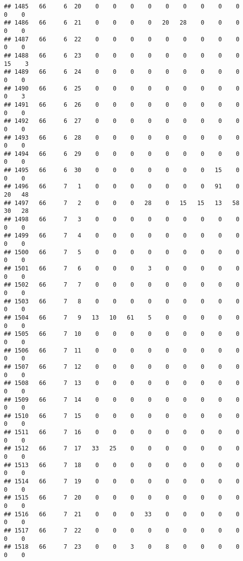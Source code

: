 \documentclass[]{article}
\begin{document}
\begin{verbatim}
## 1485   66     6  20    0    0    0    0    0    0    0    0    0    0    0
## 1486   66     6  21    0    0    0    0   20   28    0    0    0    0    0
## 1487   66     6  22    0    0    0    0    0    0    0    0    0    0    0
## 1488   66     6  23    0    0    0    0    0    0    0    0    0   15    3
## 1489   66     6  24    0    0    0    0    0    0    0    0    0    0    0
## 1490   66     6  25    0    0    0    0    0    0    0    0    0    0    3
## 1491   66     6  26    0    0    0    0    0    0    0    0    0    0    0
## 1492   66     6  27    0    0    0    0    0    0    0    0    0    0    0
## 1493   66     6  28    0    0    0    0    0    0    0    0    0    0    0
## 1494   66     6  29    0    0    0    0    0    0    0    0    0    0    0
## 1495   66     6  30    0    0    0    0    0    0    0   15    0    0    0
## 1496   66     7   1    0    0    0    0    0    0    0   91    0   20   48
## 1497   66     7   2    0    0    0   28    0   15   15   13   58   30   28
## 1498   66     7   3    0    0    0    0    0    0    0    0    0    0    0
## 1499   66     7   4    0    0    0    0    0    0    0    0    0    0    0
## 1500   66     7   5    0    0    0    0    0    0    0    0    0    0    0
## 1501   66     7   6    0    0    0    3    0    0    0    0    0    0    0
## 1502   66     7   7    0    0    0    0    0    0    0    0    0    0    0
## 1503   66     7   8    0    0    0    0    0    0    0    0    0    0    0
## 1504   66     7   9   13   10   61    5    0    0    0    0    0    0    0
## 1505   66     7  10    0    0    0    0    0    0    0    0    0    0    0
## 1506   66     7  11    0    0    0    0    0    0    0    0    0    0    0
## 1507   66     7  12    0    0    0    0    0    0    0    0    0    0    0
## 1508   66     7  13    0    0    0    0    0    0    0    0    0    0    0
## 1509   66     7  14    0    0    0    0    0    0    0    0    0    0    0
## 1510   66     7  15    0    0    0    0    0    0    0    0    0    0    0
## 1511   66     7  16    0    0    0    0    0    0    0    0    0    0    0
## 1512   66     7  17   33   25    0    0    0    0    0    0    0    0    0
## 1513   66     7  18    0    0    0    0    0    0    0    0    0    0    0
## 1514   66     7  19    0    0    0    0    0    0    0    0    0    0    0
## 1515   66     7  20    0    0    0    0    0    0    0    0    0    0    0
## 1516   66     7  21    0    0    0   33    0    0    0    0    0    0    0
## 1517   66     7  22    0    0    0    0    0    0    0    0    0    0    0
## 1518   66     7  23    0    0    3    0    8    0    0    0    0    0    0

\end{verbatim}
\end{document}
